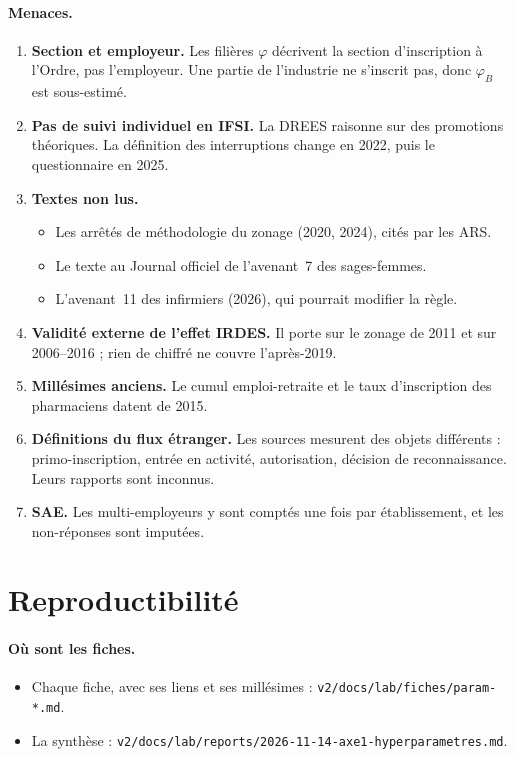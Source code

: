 \paragraph{Menaces.}
\begin{enumerate}
\item \textbf{Section et employeur.} Les filières $\varphi$ décrivent la
  section d'inscription à l'Ordre, pas l'employeur. Une partie de
  l'industrie ne s'inscrit pas, donc $\varphi_B$ est sous-estimé.
\item \textbf{Pas de suivi individuel en IFSI.} La DREES raisonne sur des
  promotions théoriques. La définition des interruptions change en 2022,
  puis le questionnaire en 2025.
\item \textbf{Textes non lus.}
  \begin{itemize}
  \item Les arrêtés de méthodologie du zonage (2020, 2024), cités par les
    ARS.
  \item Le texte au Journal officiel de l'avenant~7 des sages-femmes.
  \item L'avenant~11 des infirmiers (2026), qui pourrait modifier la règle.
  \end{itemize}
\item \textbf{Validité externe de l'effet IRDES.} Il porte sur le zonage de
  2011 et sur 2006--2016 ; rien de chiffré ne couvre l'après-2019.
\item \textbf{Millésimes anciens.} Le cumul emploi-retraite et le taux
  d'inscription des pharmaciens datent de 2015.
\item \textbf{Définitions du flux étranger.} Les sources mesurent des
  objets différents : primo-inscription, entrée en activité, autorisation,
  décision de reconnaissance. Leurs rapports sont inconnus.
\item \textbf{SAE.} Les multi-employeurs y sont comptés une fois par
  établissement, et les non-réponses sont imputées.
\end{enumerate}

\section{Reproductibilité}

\paragraph{Où sont les fiches.}
\begin{itemize}
\item Chaque fiche, avec ses liens et ses millésimes :
  \texttt{v2/docs/lab/fiches/param-*.md}.
\item La synthèse :
  \texttt{v2/docs/lab/reports/2026-11-14-axe1-hyperparametres.md}.
\end{itemize}

